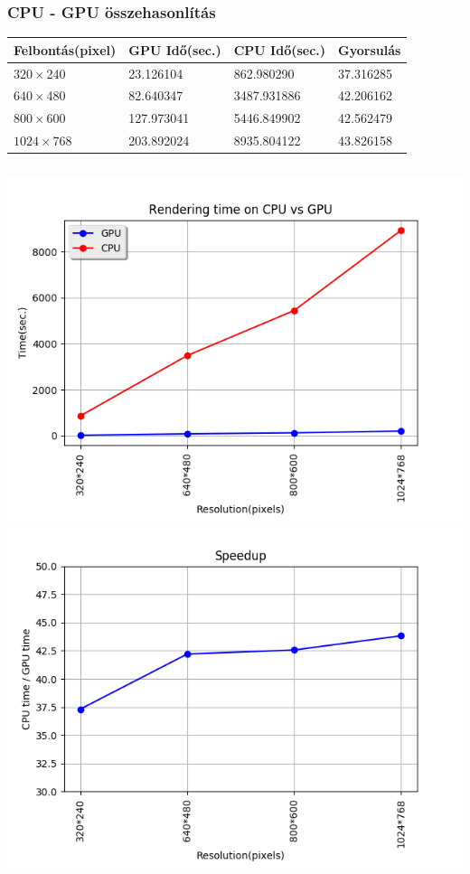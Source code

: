 \documentclass{beamer}
\begin{document}
	\begin{frame}
		\frametitle{CPU - GPU összehasonlítás}
		\begin{center}
			\begin{tabular}{ | l | l | l | l| }
				\hline
				Felbontás(pixel) & GPU Idő(sec.) &  CPU Idő(sec.) & Gyorsulás\\ \hline
				$320 \times $240 & 23.126104 & 862.980290 & 37.316285\\ \hline
				$640 \times $480 & 82.640347 & 3487.931886 & 42.206162\\ \hline
				$800 \times $600 & 127.973041 & 5446.849902 & 42.562479\\ \hline
				$1024 \times $768 & 203.892024 & 8935.804122 & 43.826158\\ \hline
			\end{tabular}
			\begin{columns}
				\includegraphics[scale=0.38]{cpu_vs_gpu.png}
				\includegraphics[scale=0.38]{speedup.png}
			\end{columns}
		\end{center}
	\end{frame}
\end{document}
